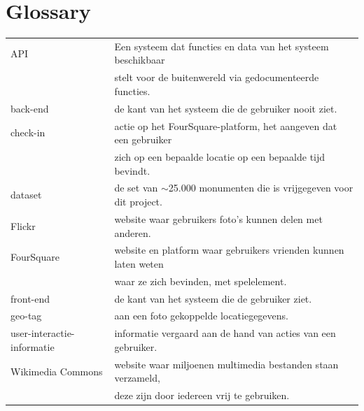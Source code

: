 \documentclass[a4paper,10pt]{article}
\begin{document}
	\clearpage
	\section{Glossary}
		\begin{tabular}{ l | l }
		API & Een systeem dat functies en data van het systeem beschikbaar  \\
			& stelt voor de buitenwereld via gedocumenteerde functies.\\
		back-end & de kant van het systeem die de gebruiker nooit ziet.\\
		check-in& actie op het FourSquare-platform, het aangeven dat een gebruiker  \\
			& zich op een bepaalde locatie op een bepaalde tijd bevindt.\\
		dataset & de set van $\sim$25.000 monumenten die is vrijgegeven voor dit project.\\
		Flickr & website waar gebruikers foto's kunnen delen met anderen.\\
		FourSquare& website en platform waar gebruikers vrienden kunnen laten weten \\
			& waar ze zich bevinden, met spelelement.\\
		front-end & de kant van het systeem die de gebruiker ziet.\\
		geo-tag & aan een foto gekoppelde locatiegegevens.\\
		user-interactie-informatie& informatie vergaard aan de hand van acties van een gebruiker.\\
		Wikimedia Commons& website waar miljoenen multimedia bestanden staan verzameld, \\
			& deze zijn door iedereen vrij te gebruiken.\\
		\end{tabular}
\end{document}
